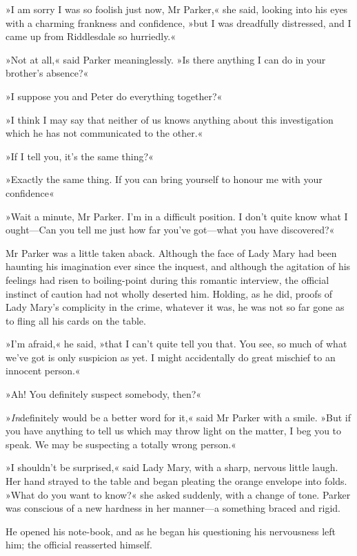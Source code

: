 »I am sorry I was so foolish just now, Mr Parker,« she said, looking into his eyes with a charming frankness and confidence, »but I was dreadfully distressed, and I came up from Riddlesdale so hurriedly.«

»Not at all,« said Parker meaninglessly. »Is there anything I can do in your brother's absence?«

»I suppose you and Peter do everything together?«

»I think I may say that neither of us knows anything about this investigation which he has not communicated to the other.«

»If I tell you, it's the same thing?«

»Exactly the same thing. If you can bring yourself to honour me with your confidence\longdash«

»Wait a minute, Mr Parker. I'm in a difficult position. I don't quite know what I ought—Can you tell me just how far you've got—what you have discovered?«

Mr Parker was a little taken aback. Although the face of Lady Mary had been haunting his imagination ever since the inquest, and although the agitation of his feelings had risen to boiling-point during this romantic interview, the official instinct of caution had not wholly deserted him. Holding, as he did, proofs of Lady Mary's complicity in the crime, whatever it was, he was not so far gone as to fling all his cards on the table.

»I'm afraid,« he said, »that I can't quite tell you that. You see, so much of what we've got is only suspicion as yet. I might accidentally do great mischief to an innocent person.«

»Ah! You definitely suspect somebody, then?«

»\textit{In}definitely would be a better word for it,« said Mr Parker with a smile. »But if you have anything to tell us which may throw light on the matter, I beg you to speak. We may be suspecting a totally wrong person.«

»I shouldn't be surprised,« said Lady Mary, with a sharp, nervous little laugh. Her hand strayed to the table and began pleating the orange envelope into folds. »What do you want to know?« she asked suddenly, with a change of tone. Parker was conscious of a new hardness in her manner—a something braced and rigid.

He opened his note-book, and as he began his questioning his nervousness left him; the official reasserted himself.

